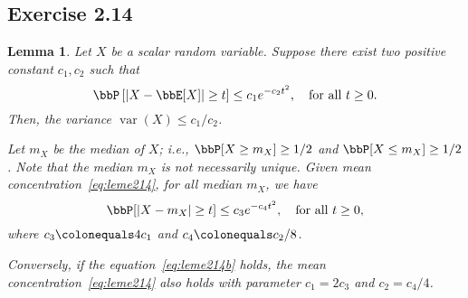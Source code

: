 \documentclass[11pt]{article}
\DeclareMathOperator{\var}{var}
\newcommand{\off}[1]{\left[#1\right]}
\theoremstyle{plain}
\newtheorem{lem}{Lemma}
\theoremstyle{definition}
\begin{document}
\subsection{Exercise 2.14}
\begin{lem}
	Let $X$ be a scalar random variable. Suppose there exist two positive constant $c_1, c_2$ such that
	\begin{equation}\label{eq:leme214}
		\bbP \off{|X - \bbE[X]| \geq t} \leq c_1 e^{-c_2 t^2},\quad \text{for all }t\geq 0.
	\end{equation}
	Then, the variance $\var(X) \leq {c_1}/{c_2}$. 
	
	\vspace{0.2cm}
	Let $m_X$ be the median of $X$; i.e., $\bbP[X \geq m_X] \geq 1/2$ and  $\bbP[X \leq m_X] \geq 1/2$. Note that the median $m_X$ is not necessarily unique. Given mean concentration~\eqref{eq:leme214}, for all median $m_X$, we have
	\begin{equation}\label{eq:leme214b}
		\bbP[|X - m_X| \geq t] \leq c_3 e^{-c_4t^2}, \quad \text{for all }t \geq 0,
	\end{equation} 
	where $c_3 \colonequals 4c_1$ and $c_4 \colonequals c_2/8$.
	
	 Conversely, if the equation~\eqref{eq:leme214b} holds, the mean concentration~\eqref{eq:leme214} also holds with parameter $c_1 = 2c_3$ and $c_2 = c_4/4$.
\end{lem}
\end{document}
